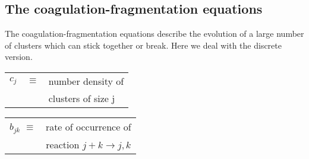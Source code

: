 \documentclass{article}
\def\to{\rightarrow}
\begin{document}
\setlength{\columnsep}{1cm}
\begin{multicols}{3}

\noindent
{}

\section*{The coa\-gu\-la\-tion-frag\-men\-ta\-tion equations}

The coagulation-fragmentation equations describe the
evolution of a large number of clusters which can stick together or
break. Here we deal with the discrete version.

\begin{center}

  \begin{tabular}{lll}
    $c_j$  &  $\equiv$  &  number density of\\
    &&                     clusters of size j
  \end{tabular}
  \vspace{.2cm}


  \begin{minipage}[t]{.4\linewidth}
    \begin{center}

      \begin{tabular}{cc}
        $b_{jk}$  $\equiv$ &  rate of occurrence of\\
        &  reaction $j+k \to j,k$
      \end{tabular}
    \end{center}
  \end{minipage}
  \hspace{.3cm}
  \begin{minipage}[t]{.4\linewidth}
    \begin{center}


\end{center}
\end{minipage}
\end{center}
\end{multicols}
\end{document}
